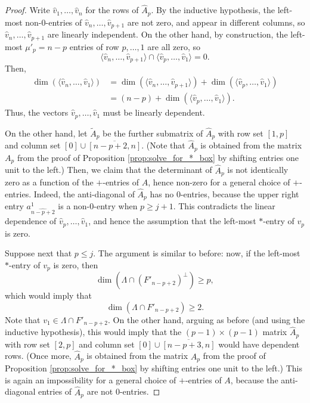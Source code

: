 \documentclass[12pt]{amsart}
\begin{document}
\begin{proof}
Write $\widehat{v}_1,\ldots,\widehat{v}_n$ for the rows of $\widehat{A}_p$. By the inductive hypothesis, the left-most non-$0$-entries of $\widehat{v}_n, \ldots, \widehat{v}_{p+1}$ are not zero, and appear in different columns, so $\widehat{v}_n, \ldots,\widehat{v}_{p+1}$ are linearly independent. On the other hand, by construction, the left-most $\mu'_{p}=n-p$ entries of row $p, \ldots, 1$ are all zero, so 
\begin{equation*}
    \langle \widehat{v}_n, \ldots, \widehat{v}_{p+1} \rangle \cap \langle \widehat{v}_{p}, \ldots, \widehat{v}_1 \rangle = 0.
\end{equation*}
Then, 
   \begin{align*}
       \dim(\langle \widehat{v}_n, \ldots,\widehat{v}_1 \rangle) &= \dim(\langle \widehat{v}_n, \ldots,\widehat{v}_{p+1} \rangle)+\dim(\langle \widehat{v}_{p}, \ldots,\widehat{v}_{1} \rangle)\\
       &= (n-p) + \dim(\langle \widehat{v}_{p}, \ldots,\widehat{v}_{1} \rangle).
   \end{align*}
    Thus, the vectors $\widehat{v}_{p}, \ldots,\widehat{v}_{1}$ must be linearly dependent. 
    
    On the other hand, let $\widetilde{A}_p$ be the further submatrix of $\widehat{A}_p$ with row set $[1,p]$ and column set $[0]\cup \overline{[n-p+2,n]}$. (Note that $\widehat{A}_p$ is obtained from the matrix $A_p$ from the proof of Proposition \ref{prop:solve_for_*_box} by shifting entries one unit to the left.) Then, we claim that the determinant of $\widehat{A}_p$ is not identically zero as a function of the $+$-entries of $A$, hence non-zero for a general choice of $+$-entries. Indeed, the anti-diagonal of $\widehat{A}_p$ has no $0$-entries, because the upper right entry $a^1_{\widehat{n-p+2}}$ is a non-$0$-entry when $p\ge j+1$. This contradicts the linear dependence of $\widehat{v}_{p}, \ldots,\widehat{v}_{1}$, and hence the assumption that the left-most $*$-entry of $v_p$ is zero.

Suppose next that $p\le j$. The argument is similar to before: now, if the left-most $*$-entry of $v_p$ is zero, then 
    \begin{equation*}
        \dim(\Lambda \cap (F'_{n-p+2})^\perp) \ge p,
    \end{equation*}
    which would imply that 
    \begin{equation*}
        \dim(\Lambda \cap F'_{n-p+2}) \ge 2.
    \end{equation*}
Note that $v_1\in \Lambda \cap F'_{n-p+2}$. On the other hand, arguing as before (and using the inductive hypothesis), this would imply that the $(p-1)\times (p-1)$ matrix $\widehat{A}_p$ with row set $[2,p]$ and column set $[0]\cup \overline{[n-p+3,n]}$ would have dependent rows. (Once more, $\widehat{A}_p$ is obtained from the matrix $A_p$ from the proof of Proposition \ref{prop:solve_for_*_box} by shifting entries one unit to the left.) This is again an impossibility for a general choice of $+$-entries of $A$, because the anti-diagonal entries of $\widehat{A}_p$ are not 0-entries.   
\end{proof}
\end{document}
